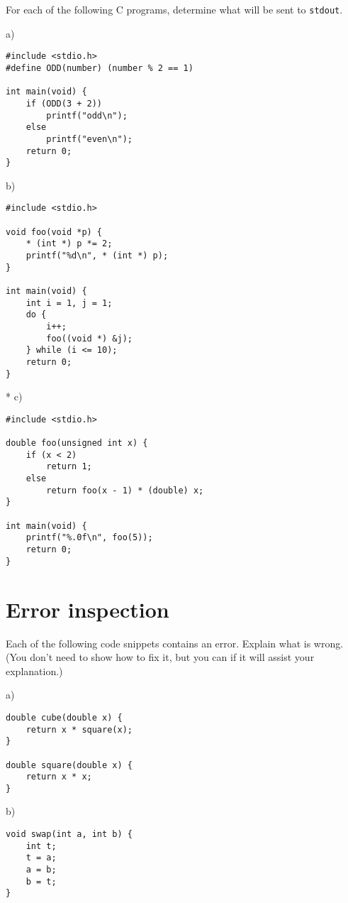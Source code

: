 \documentclass[a4paper,12pt]{article}
\begin{document}
For each of the following C programs, determine what will be sent to
\texttt{stdout}.

a) %

\begin{lstlisting}
#include <stdio.h>
#define ODD(number) (number % 2 == 1)

int main(void) {
	if (ODD(3 + 2))
		printf("odd\n");
	else
		printf("even\n");
	return 0;
}
\end{lstlisting}

b) %

\begin{lstlisting}
#include <stdio.h>

void foo(void *p) {
	* (int *) p *= 2;
	printf("%d\n", * (int *) p);
}

int main(void) {
	int i = 1, j = 1;
	do {
		i++;
		foo((void *) &j);
	} while (i <= 10);
	return 0;
}
\end{lstlisting}

* c) %

\begin{lstlisting}
#include <stdio.h>

double foo(unsigned int x) {
	if (x < 2)
		return 1;
	else
		return foo(x - 1) * (double) x;
}

int main(void) {
	printf("%.0f\n", foo(5));
	return 0;
}
\end{lstlisting}

\newpage

\section{Error inspection}

Each of the following code snippets contains an error. Explain what is
wrong. (You don't need to show how to fix it, but you can if it will
assist your explanation.)

a) %

\begin{lstlisting}
double cube(double x) {
	return x * square(x);
}

double square(double x) {
	return x * x;
}
\end{lstlisting}

b) %

\begin{lstlisting}
void swap(int a, int b) {
	int t;
	t = a;
	a = b;
	b = t;
}
\end{lstlisting}
\end{document}
